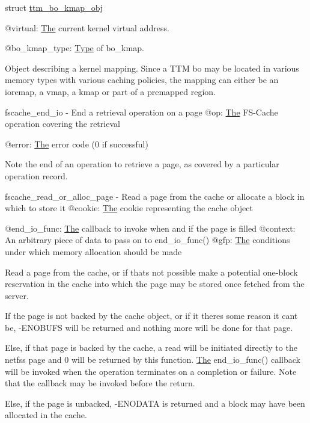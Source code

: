 struct \mbox{\hyperlink{structttm__bo__kmap__obj}{ttm\+\_\+bo\+\_\+kmap\+\_\+obj}}

@virtual\+: \mbox{\hyperlink{classThe}{The}} current kernel virtual address.

@bo\+\_\+kmap\+\_\+type\+: \mbox{\hyperlink{protocolType-p}{Type}} of bo\+\_\+kmap.

Object describing a kernel mapping. Since a T\+TM bo may be located in various memory types with various caching policies, the mapping can either be an ioremap, a vmap, a kmap or part of a premapped region.

fscache\+\_\+end\+\_\+io -\/ End a retrieval operation on a page @op\+: \mbox{\hyperlink{classThe}{The}} F\+S-\/\+Cache operation covering the retrieval

@error\+: \mbox{\hyperlink{classThe}{The}} error code (0 if successful)

Note the end of an operation to retrieve a page, as covered by a particular operation record.

fscache\+\_\+read\+\_\+or\+\_\+alloc\+\_\+page -\/ Read a page from the cache or allocate a block in which to store it @cookie\+: \mbox{\hyperlink{classThe}{The}} cookie representing the cache object

@end\+\_\+io\+\_\+func\+: \mbox{\hyperlink{classThe}{The}} callback to invoke when and if the page is filled @context\+: An arbitrary piece of data to pass on to end\+\_\+io\+\_\+func() @gfp\+: \mbox{\hyperlink{classThe}{The}} conditions under which memory allocation should be made

Read a page from the cache, or if that\textquotesingle{}s not possible make a potential one-\/block reservation in the cache into which the page may be stored once fetched from the server.

If the page is not backed by the cache object, or if it there\textquotesingle{}s some reason it can\textquotesingle{}t be, -\/E\+N\+O\+B\+U\+FS will be returned and nothing more will be done for that page.

Else, if that page is backed by the cache, a read will be initiated directly to the netfs\textquotesingle{}s page and 0 will be returned by this function. \mbox{\hyperlink{classThe}{The}} end\+\_\+io\+\_\+func() callback will be invoked when the operation terminates on a completion or failure. Note that the callback may be invoked before the return.

Else, if the page is unbacked, -\/E\+N\+O\+D\+A\+TA is returned and a block may have been allocated in the cache.

